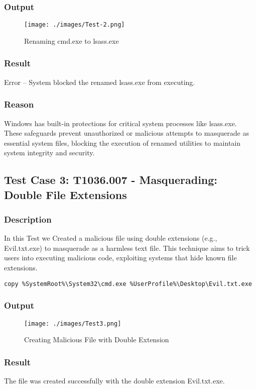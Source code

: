 \documentclass[11pt]{article}
\begin{document}
\subsubsection{Output}
\begin{figure}[H]
    \centering
    \texttt{[image: ./images/Test-2.png]}
    \caption{Renaming cmd.exe to lsass.exe}
\end{figure}
\subsubsection{Result}
Error – System blocked the renamed lsass.exe from executing.
\subsubsection{Reason}
Windows has built-in protections for critical system processes like lsass.exe. These safeguards prevent unauthorized or malicious attempts to masquerade as essential system files, blocking the execution of renamed utilities to maintain system integrity and security.

\subsection{Test Case 3: T1036.007 - Masquerading: Double File Extensions}
\subsubsection{Description}
In this Test we Created a malicious file using double extensions (e.g., Evil.txt.exe) to masquerade as a harmless text file. This technique aims to trick users into executing malicious code, exploiting systems that hide known file extensions.
\begin{lstlisting}
copy %SystemRoot%\System32\cmd.exe %UserProfile%\Desktop\Evil.txt.exe
\end{lstlisting}
\subsubsection{Output}
\begin{figure}[H]
    \centering
    \texttt{[image: ./images/Test3.png]}
    \caption{Creating Malicious File with Double Extension}
\end{figure}
\subsubsection{Result}
The file was created successfully with the double extension Evil.txt.exe.
\end{document}
